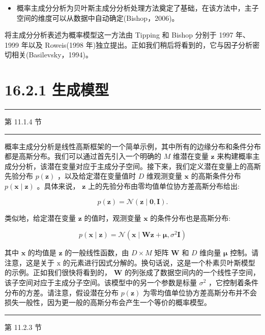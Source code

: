 \documentclass[10pt]{report}
\newcommand{\HRule}{\begin{center}\rule{0.9\linewidth}{0.2mm}\end{center}}
\begin{document}
\begin{itemize}
\item 概率主成分分析为贝叶斯主成分分析处理方法奠定了基础，在该方法中，主子空间的维度可以从数据中自动确定(Bishop，2006)。
\end{itemize}

将主成分分析表述为概率模型这一方法由 Tipping 和 Bishop 分别于 1997 年、1999 年以及 Roweis(1998 年)独立提出。正如我们稍后将看到的，它与因子分析密切相关(Basilevsky，1994)。

\section*{16.2.1 生成模型}

\HRule

第 11.1.4 节

\HRule

概率主成分分析是线性高斯框架的一个简单示例，其中所有的边缘分布和条件分布都是高斯分布。我们可以通过首先引入一个明确的 \(M\) 维潜在变量 \(\mathbf{z}\) 来构建概率主成分分析，该潜在变量对应于主成分子空间。接下来，我们定义潜在变量上的高斯先验分布 \(p\left( \mathbf{z}\right)\) ，以及给定潜在变量值时 \(D\) 维观测变量 \(\mathbf{x}\) 的高斯条件分布 \(p\left( {\mathbf{x} \mid  \mathbf{z}}\right)\) 。具体来说， \(\mathbf{z}\) 上的先验分布由零均值单位协方差高斯分布给出:

\[
p\left( \mathbf{z}\right)  = \mathcal{N}\left( {\mathbf{z} \mid  \mathbf{0},\mathbf{I}}\right) . \tag{16.31}
\]

类似地，给定潜在变量 \(\mathbf{z}\) 的值时，观测变量 \(\mathbf{x}\) 的条件分布也是高斯分布:

\[
p\left( {\mathbf{x} \mid  \mathbf{z}}\right)  = \mathcal{N}\left( {\mathbf{x} \mid  \mathbf{W}\mathbf{z} + \mathbf{\mu },{\sigma }^{2}\mathbf{I}}\right)  \tag{16.32}
\]

其中 \(\mathbf{x}\) 的均值是 \(\mathbf{z}\) 的一般线性函数，由 \(D \times  M\) 矩阵 \(\mathbf{W}\) 和 \(D\) 维向量 \(\mathbf{\mu }\) 控制。请注意，这是关于 \(\mathrm{x}\) 的元素进行因式分解的。换句话说，这是一个朴素贝叶斯模型的示例。正如我们很快将看到的， \(\mathbf{W}\) 的列张成了数据空间内的一个线性子空间，该子空间对应于主成分子空间。该模型中的另一个参数是标量 \({\sigma }^{2}\) ，它控制着条件分布的方差。请注意，假设潜在分布 \(p\left( \mathbf{z}\right)\) 为零均值单位协方差高斯分布并不会损失一般性，因为更一般的高斯分布会产生一个等价的概率模型。

\HRule

第 11.2.3 节
\end{document}
